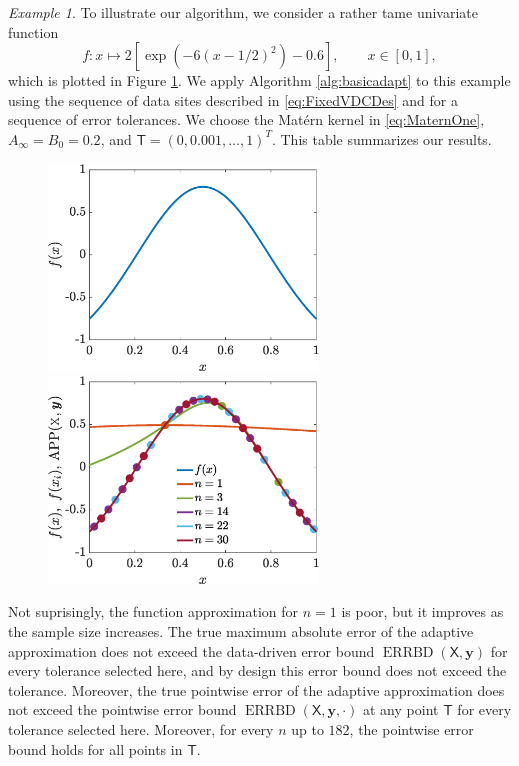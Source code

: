 \documentclass[]{mcom-l}
\theoremstyle{remark}
\newtheorem{example}{Example}
\DeclareMathOperator{\errBd}{ERRBD}
\newcommand{\mT}{\mathsf{T}}
\newcommand{\mX}{\mathsf{X}}
\newcommand{\by}{{\boldsymbol{y}}}
\begin{document}
\begin{example}
	\label{ex:adpsamplesize}
	To illustrate our algorithm, we consider a rather tame  univariate function 
	\begin{equation}
	f: x \mapsto 2 [\exp(-6(x-1/2)^2)- 0.6], \qquad x \in [0,1],
	\end{equation}
	which is plotted in Figure \ref{fig:ex1}.  We apply Algorithm \ref{alg:basicadapt} to this example using the sequence of data sites described in \eqref{eq:FixedVDCDes} and for a sequence of error tolerances.  We choose the Mat\'ern kernel in \eqref{eq:MaternOne},  $A_\infty = B_0 = 0.2$, and $\mT = (0, 0.001, \ldots, 1)^T$.  This table summarizes our results.
	
	
	
	
	\begin{figure}[H]
		\centering
		\includegraphics[height = 5.5cm]{ProgramsImages/SimpleFunPlot.eps} \qquad
		\includegraphics[height = 5.5cm]{ProgramsImages/SimpleFunAlg1.eps}
		\caption{ \label{fig:ex1}}
	\end{figure}
	
Not suprisingly, the function approximation for $n=1$ is poor, but it improves as the sample size increases.  The true  maximum absolute error of the adaptive approximation does not exceed the data-driven error bound $\errBd(\mX,\by)$ for every tolerance selected here, and by design this error bound does not exceed the tolerance.  Moreover, the true pointwise error of the adaptive approximation does not exceed the pointwise error bound $\errBd(\mX,\by,\cdot)$ at any point $\mT$ for every tolerance selected here.  Moreover, for every $n$ up to $182$, the pointwise error bound holds for all points in  $\mT$.
	
\end{example} 
\end{document}
